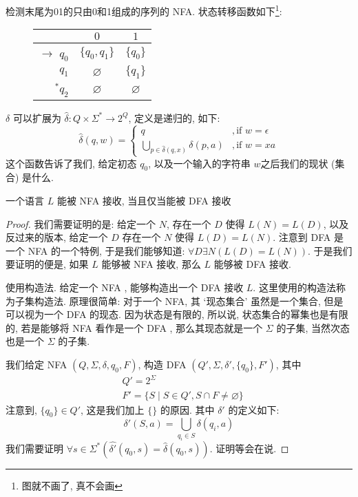\documentclass[../main.tex]{subfiles}
\begin{document}
\begin{exam}
检测末尾为01的只由0和1组成的序列的 NFA. 状态转移函数如下\footnote{图就不画了, 真不会画}: 
\begin{figure}[h]
\centering
\begin{tabular}{|r|cc|}
\hline
& \(0\) & \(1\) \\ 
\hline 
$\to$ \(q_{0}\) & \(\{ q_{0}, q_{1}\}\) & \(\{q_{0}\}\)\\ 
\(q_{1	}\) & $\varnothing$ & \(\{q_{1} \}\) \\
\(^{*}q_{2}\) & $\varnothing$ & $\varnothing$\\
\hline
\end{tabular}
\end{figure}

\end{exam}
\begin{definition}[状态转移函数的拓展]
\(\delta\) 可以扩展为 \(\hat{\delta}\colon Q \times \Sigma ^{*} \to 2^{Q}\), 定义是递归的, 如下:
\[
\hat{\delta}(q, w) = 
\begin{cases}
q &, \text{if } w = \epsilon \\
\bigcup_{p\in \hat{\delta}(q,x)} \delta(p,a) & , \text{if } w = xa
\end{cases}
\]
这个函数告诉了我们, 给定初态 \(q_{0}\), 以及一个输入的字符串 \(w\)之后我们的现状 (集合) 是什么. 
\end{definition}
\begin{thm}[NFA和DFA之间的等价性]\label{Thm:nfa=dfa}
一个语言 \(L\) 能被 NFA 接收, 当且仅当能被 DFA 接收
\end{thm}
\begin{proof}
我们需要证明的是: 给定一个 \(N\), 存在一个 \(D\) 使得 \(L (N) = L (D) \), 以及反过来的版本, 给定一个 \(D\) 存在一个 \(N\) 使得 \(L (D) = L(N)\).
注意到 DFA 是一个 NFA 的一个特例, 于是我们能够知道: \(\forall D \exists N (L(D) = L(N)) \). 于是我们要证明的便是, 如果 \(L\) 能够被 NFA 接收, 那么 \(L\) 能够被 DFA 接收. 

使用构造法. 给定一个 NFA , 能够构造出一个 DFA 接收 \(L\). 这里使用的构造法称为子集构造法. 原理很简单: 对于一个 NFA, 其 `现态集合' 虽然是一个集合, 但是可以视为一个 DFA 的现态. 因为状态是有限的, 所以说, 状态集合的幂集也是有限的, 若是能够将 NFA 看作是一个 DFA , 那么其现态就是一个 \(\Sigma\) 的子集, 当然次态也是一个 \(\Sigma\) 的子集. 

我们给定 NFA \((Q,\Sigma,\delta, q_{0},F)\), 构造 DFA \((Q' , \Sigma, \delta ' , \{q_{0}\}, F')\), 其中 
\[
\begin{aligned}
& Q '  =  2 ^{\Sigma} \\ 
& F' = \{ S \mid S \in Q ', S \cap F  \ne \varnothing \}
\end{aligned}
\]
注意到, \(\{q_{0}\}\in Q'\), 这是我们加上 \(\{\}\) 的原因. 其中 \(\delta '\) 的定义如下: 
\[
\delta ' (S, a) = \bigcup_{q_{i} \in S} \delta (q_{i}, a) 
\]
我们需要证明 \(\forall s \in \Sigma ^{*} (\hat{\delta'} (q_{0}, s) = \hat{\delta} (q_{0},s))\). 证明等会在说. 
\end{proof}
\end{document}
